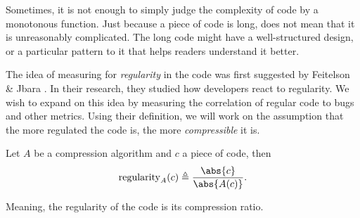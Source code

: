 \label{regularity}
Sometimes, it is not enough to simply judge the complexity of code by a monotonous function.
Just because a piece of code is long, does not mean that it is unreasonably complicated.
The long code might have a well-structured design, or a particular pattern to it that helps readers understand it better.

The idea of measuring for \emph{regularity} in the code was first suggested by Feitelson \& Jbara \cite{Jbara:Feitelson:13}.
In their research, they studied how developers react to regularity.
We wish to expand on this idea by measuring the correlation of regular code to bugs and other metrics.
Using their definition, we will work on the assumption that the more regulated the code is, the more \textit{compressible} it is.
\begin{define}
Let $A$ be a compression algorithm and $c$ a piece of code, then $$\mathrm{regularity}_A(c)\triangleq\frac{\abs{c}}{\abs{A(c)}}.$$
\end{define}
Meaning, the regularity of the code is its compression ratio.